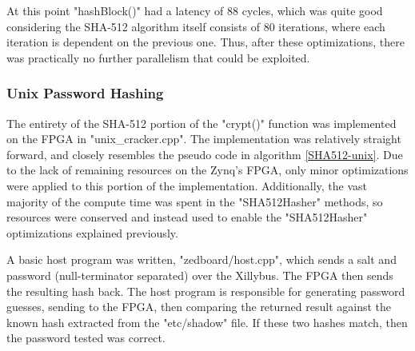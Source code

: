 At this point "hashBlock()" had a latency of 88 cycles, which was quite good
considering the SHA-512 algorithm itself consists of 80 iterations,
where each iteration is dependent on the previous one. Thus, after these optimizations,
there was practically no further parallelism that could be exploited.

\subsubsection{Unix Password Hashing}
The entirety of the SHA-512 portion of the "crypt()" function was implemented
on the FPGA in "unix_cracker.cpp". The implementation was relatively straight
forward, and closely resembles the pseudo code in algorithm \ref{SHA512-unix}.
Due to the lack of remaining resources on the Zynq's FPGA, only minor
optimizations were applied to this portion of the implementation.
Additionally, the vast majority of the compute time was spent in the
"SHA512Hasher" methods, so resources were conserved and instead used to enable the
"SHA512Hasher" optimizations explained previously.

A basic host program was written, "zedboard/host.cpp", which sends a
salt and password (null-terminator separated) over the Xillybus. The FPGA then
sends the resulting hash back. The host program is responsible for
generating password guesses, sending to the FPGA, then comparing the returned
result against the known hash extracted from the "etc/shadow" file.
If these two hashes match, then the password tested was correct.

